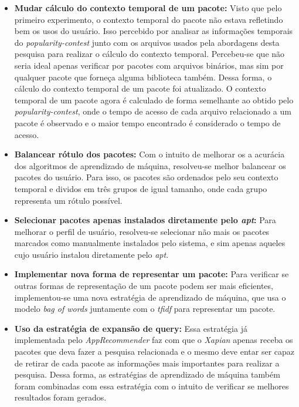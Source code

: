\begin{itemize}
   \item \textbf{Mudar cálculo do contexto temporal de um pacote: } Visto que
   pelo primeiro experimento, o contexto temporal do pacote não estava
   refletindo bem os usos do usuário. Isso percebido por analisar as informações
   temporais do \textit{popularity-contest} junto com os arquivos usados pela
   abordagens desta pesquisa para realizar o cálculo do contexto temporal.
   Percebeu-se que não seria ideal apenas verificar por pacotes com
   arquivos binários, mas sim por qualquer pacote que forneça alguma
   biblioteca também. Dessa forma, o cálculo do contexto temporal de um
   pacote foi atualizado. O contexto temporal de um pacote agora é calculado de
   forma semelhante ao obtido pelo \textit{popularity-contest}, onde o tempo de
   acesso de cada arquivo relacionado a um pacote é observado e o maior tempo
   encontrado é considerado o tempo de acesso.

   \item \textbf{Balancear rótulo dos pacotes: } Com o intuito de melhorar os
   a acurácia dos algoritmos de aprendizado de máquina, resolveu-se melhor
   balancear os pacotes do usuário. Para isso, os pacotes são ordenados pelo seu
   contexto temporal e dividos em três grupos de igual tamanho, onde cada grupo
   representa um rótulo possível.

   \item \textbf{Selecionar pacotes apenas instalados diretamente pelo
   \textit{apt}:} Para melhorar o perfil de usuário, resolveu-se selecionar não
   mais os pacotes marcados como manualmente instalados pelo sistema, e sim
   apenas aqueles cujo usuário instalou diretamente pelo \textit{apt}.

   \item \textbf{Implementar nova forma de representar um pacote: } Para
   verificar se outras formas de representação de um pacote podem ser mais
   eficientes, implementou-se uma nova estratégia de aprendizado de máquina, que
   usa o modelo \textit{bag of words} juntamente com o \textit{tfidf} para
   representar um pacote.

   \item \textbf{Uso da estratégia de expansão de query: } Essa estratégia já
   implementada pelo \textit{AppRecommender} faz com que o \textit{Xapian}
   apenas receba os pacotes que deva fazer a pesquisa relacionada e o mesmo deve
   entar ser capaz de retirar de cada pacote as informações mais importantes
   para realizar a pesquisa. Dessa forma, as estratégias de aprendizado de
   máquina também foram combinadas com essa estratégia com o intuito de
   verificar se melhores resultados foram gerados.


\end{itemize}
